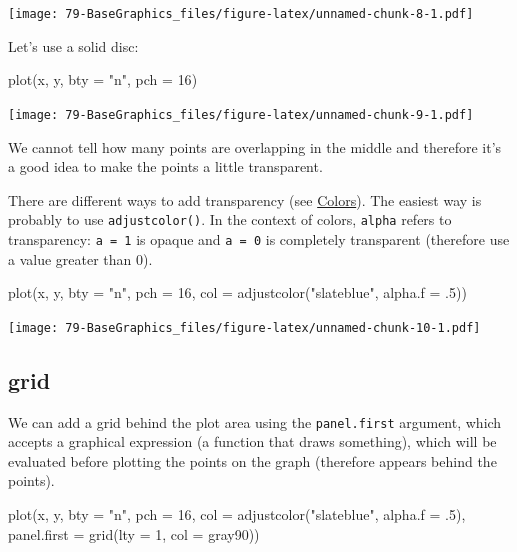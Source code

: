 \documentclass[
]{book}
\newenvironment{Shaded}{\begin{snugshade}}{\end{snugshade}}
\newcommand{\AttributeTok}[1]{\textcolor[rgb]{0.77,0.63,0.00}{#1}}
\newcommand{\DecValTok}[1]{\textcolor[rgb]{0.00,0.00,0.81}{#1}}
\newcommand{\FunctionTok}[1]{\textcolor[rgb]{0.00,0.00,0.00}{#1}}
\newcommand{\NormalTok}[1]{#1}
\newcommand{\StringTok}[1]{\textcolor[rgb]{0.31,0.60,0.02}{#1}}
\begin{document}
\texttt{[image: 79-BaseGraphics\_files/figure-latex/unnamed-chunk-8-1.pdf]}

Let's use a solid disc:

\begin{Shaded}
\begin{Highlighting}[]
\FunctionTok{plot}\NormalTok{(x, y, }\AttributeTok{bty =} \StringTok{"n"}\NormalTok{, }\AttributeTok{pch =} \DecValTok{16}\NormalTok{)}
\end{Highlighting}
\end{Shaded}

\texttt{[image: 79-BaseGraphics\_files/figure-latex/unnamed-chunk-9-1.pdf]}

We cannot tell how many points are overlapping in the middle and therefore it's a good idea to make the points a little transparent.

There are different ways to add transparency (see \protect\hyperlink{colors}{Colors}). The easiest way is probably to use \texttt{adjustcolor()}. In the context of colors, \texttt{alpha} refers to transparency: \texttt{a\ =\ 1} is opaque and \texttt{a\ =\ 0} is completely transparent (therefore use a value greater than 0).

\begin{Shaded}
\begin{Highlighting}[]
\FunctionTok{plot}\NormalTok{(x, y,}
     \AttributeTok{bty =} \StringTok{"n"}\NormalTok{, }\AttributeTok{pch =} \DecValTok{16}\NormalTok{,}
     \AttributeTok{col =} \FunctionTok{adjustcolor}\NormalTok{(}\StringTok{"slateblue"}\NormalTok{, }\AttributeTok{alpha.f =}\NormalTok{ .}\DecValTok{5}\NormalTok{))}
\end{Highlighting}
\end{Shaded}

\texttt{[image: 79-BaseGraphics\_files/figure-latex/unnamed-chunk-10-1.pdf]}

\hypertarget{grid}{%
\subsection{grid}\label{grid}}

We can add a grid behind the plot area using the \texttt{panel.first} argument, which accepts a graphical expression (a function that draws something), which will be evaluated before plotting the points on the graph (therefore appears behind the points).

\begin{Shaded}
\begin{Highlighting}[]
\FunctionTok{plot}\NormalTok{(x, y,}
     \AttributeTok{bty =} \StringTok{"n"}\NormalTok{, }\AttributeTok{pch =} \DecValTok{16}\NormalTok{,}
     \AttributeTok{col =} \FunctionTok{adjustcolor}\NormalTok{(}\StringTok{"slateblue"}\NormalTok{, }\AttributeTok{alpha.f =}\NormalTok{ .}\DecValTok{5}\NormalTok{),}
     \AttributeTok{panel.first =} \FunctionTok{grid}\NormalTok{(}\AttributeTok{lty =} \DecValTok{1}\NormalTok{, }\AttributeTok{col =} \StringTok{\textquotesingle{}gray90\textquotesingle{}}\NormalTok{))}
\end{Highlighting}
\end{Shaded}
\end{document}
